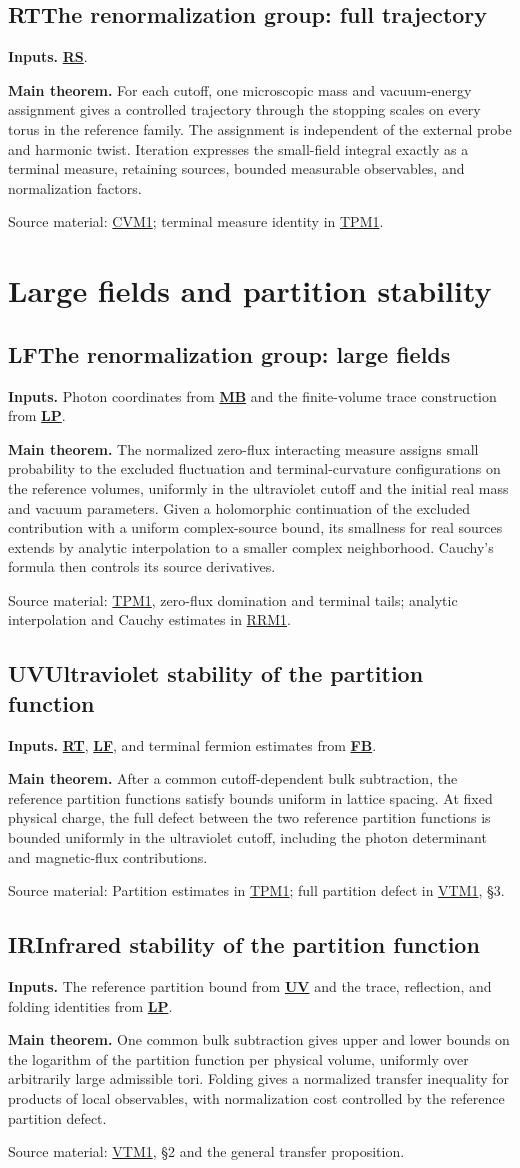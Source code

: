 \documentclass[11pt]{article}
\newcommand{\Code}[1]{\hyperlink{block-#1}{\textbf{#1}}}
\newcommand{\Block}[2]{\hypertarget{block-#1}{}%
 \subsection*{\textcolor{flowgreen}{#1}\quad #2}}
\newcommand{\Inputs}[1]{\textbf{Inputs.} #1\par}
\newcommand{\Theorem}[1]{\textbf{Main theorem.} #1\par}
\newcommand{\Sources}[1]{\par{\small\textcolor{flowgray}{Source material:} #1\par}}
\newcommand{\Repo}{https://github.com/ethanwsussman/Yang--Mills-LLM-experiment}
\newcommand{\Old}[2]{\href{\Repo/#1}{#2}}
\newcommand{\CVsource}{\Old{tree/main/QED3/OLD/Submanuscripts/Cover\%20agreement\%20and\%20common\%20tuning\%20\%28CV1\%29}{CVM1}}
\newcommand{\TPsource}{\Old{tree/main/QED3/OLD/Submanuscripts/Terminal\%20measure\%20and\%20pressure\%20\%28TP1\%29}{TPM1}}
\newcommand{\RRsource}{\Old{tree/main/QED3/OLD/Submanuscripts/Reference\%20response\%20\%28RR1\%29}{RRM1}}
\newcommand{\VTsource}{\Old{tree/main/QED3/OLD/Submanuscripts/Volume\%20transfer\%20\%28VT1\%29}{VTM1}}
\begin{document}
\Block{RT}{The renormalization group: full trajectory}
\Inputs{\Code{RS}.}
\Theorem{For each cutoff, one microscopic mass and vacuum-energy
assignment gives a controlled trajectory through the stopping scales
on every torus in the reference family. The assignment is independent
of the external probe and harmonic twist. Iteration expresses the
small-field integral exactly as a terminal measure, retaining sources,
bounded measurable observables, and normalization factors.}
\Sources{\CVsource; terminal measure identity in \TPsource.}

\clearpage
\section*{Large fields and partition stability}

\Block{LF}{The renormalization group: large fields}
\Inputs{Photon coordinates from \Code{MB} and the finite-volume trace
construction from \Code{LP}.}
\Theorem{The normalized zero-flux interacting measure assigns small
probability to the excluded fluctuation and terminal-curvature
configurations on the reference volumes, uniformly in the ultraviolet
cutoff and the initial real mass and vacuum parameters.
Given a holomorphic continuation of the excluded contribution with
a uniform complex-source bound, its smallness for real sources extends
by analytic interpolation to a smaller complex neighborhood.
Cauchy's formula then controls its source derivatives.}
\Sources{\TPsource, zero-flux domination and terminal tails;
analytic interpolation and Cauchy estimates in \RRsource.}

\Block{UV}{Ultraviolet stability of the partition function}
\Inputs{\Code{RT}, \Code{LF}, and terminal fermion estimates from \Code{FB}.}
\Theorem{After a common cutoff-dependent bulk subtraction, the reference
partition functions satisfy bounds uniform in lattice spacing.
At fixed physical charge, the full defect between the two reference
partition functions is bounded uniformly in the ultraviolet cutoff,
including the photon determinant and magnetic-flux contributions.}
\Sources{Partition estimates in \TPsource; full partition defect in \VTsource, \S3.}

\Block{IR}{Infrared stability of the partition function}
\Inputs{The reference partition bound from \Code{UV} and the trace,
reflection, and folding identities from \Code{LP}.}
\Theorem{One common bulk subtraction gives upper and lower bounds on
the logarithm of the partition function per physical volume, uniformly
over arbitrarily large admissible tori. Folding gives a normalized
transfer inequality for products of local observables, with normalization
cost controlled by the reference partition defect.}
\Sources{\VTsource, \S2 and the general transfer proposition.}
\end{document}
